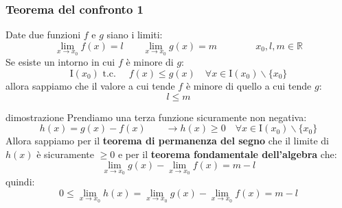 \documentclass[x11names]{article}
\begin{document}
	
	
	
	\begin{center}
		\colorbox{myred}{\begin{minipage}{5.75in}
				\begin{redes}{}
					\subsubsection{Teorema del confronto 1}
					Date due funzioni $f$ e $g$ siano i limiti:
					\[
					\lim_{x \to x_0} f(x)  = l \qquad \lim_{x \to x_0} g(x)  = m \qquad \qquad x_0,l,m \in \mathbb{R}
					\]
					Se esiste un intorno in cui $f$ è minore di $g$: 
					\[
					\text{I}(x_0) \text{  t.c. } \quad f(x) \leq g(x) \quad \forall x \in \text{I}(x_0) \backslash \{x_0\}
					\]
					allora sappiamo che il valore a cui tende $f$ è minore di quello a cui tende $g$:
					\[
					l \leq m
					\]
				\end{redes}
		\end{minipage}}        
	\end{center}
	
	\begin{es}{dimostrazione}
		Prendiamo una terza funzione sicuramente non negativa:
		\[
		h(x) = g(x) - f(x) \qquad \to h(x) \geq 0 \quad \forall x \in \text{I}(x_0) \backslash \{x_0\}
		\]
		Allora sappiamo per il \textbf{teorema di permanenza del segno} che il limite di $h(x)$ è sicuramente $\geq 0$ e per il \textbf{teorema fondamentale dell'algebra} che:
		\[
		\lim_{x \to x_0} g(x)- \lim_{x \to x_0} f(x) = m - l
		\]
		quindi:
		\[
		0 \leq  \lim_{x \to x_0} h(x) = \lim_{x \to x_0} g(x)- \lim_{x \to x_0} f(x) = m - l
		\]
	\end{es}
	
\end{document}
